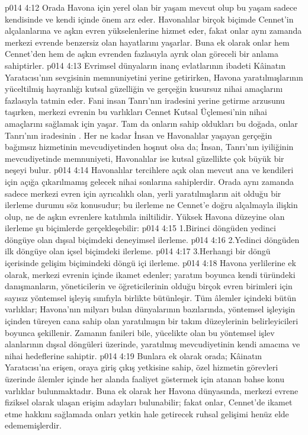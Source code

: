 \vs p014 4:12 Orada Havona için yerel olan bir yaşam mevcut olup bu yaşam sadece kendisinde ve kendi içinde önem arz eder. Havonalılar birçok biçimde Cennet’in alçalanlarına ve aşkın evren yükselenlerine hizmet eder, fakat onlar aynı zamanda merkezi evrende benzersiz olan hayatlarını yaşarlar. Buna ek olarak onlar hem Cennet’den hem de aşkın evrenden fazlasıyla ayrık olan göreceli bir anlama sahiptirler.
\vs p014 4:13 Evrimsel dünyaların inanç evlatlarının ibadeti Kâinatın Yaratıcısı’nın sevgisinin memnuniyetini yerine getirirken, Havona yaratılmışlarının yüceltilmiş hayranlığı kutsal güzelliğin ve gerçeğin kusursuz nihai amaçlarını fazlasıyla tatmin eder. Fani insan Tanrı’nın iradesini yerine getirme arzusunu taşırken, merkezi evrenin bu varlıkları Cennet Kutsal Üçlemesi’nin nihai amaçlarını sağlamak için yaşar. Tam da onların sahip oldukları bu doğada, onlar Tanrı’nın iradesinin . Her ne kadar İnsan ve Havonalılar yaşayan gerçeğin bağımsız hizmetinin mevcudiyetinden hoşnut olsa da; İnsan, Tanrı’nın iyiliğinin mevcudiyetinde memnuniyeti, Havonalılar ise kutsal güzellikte çok büyük bir neşeyi bulur.
\vs p014 4:14 Havonalılar tercihlere açık olan mevcut ana ve kendileri için açığa çıkarılmamış gelecek nihai sonlarına sahiplerdir. Orada aynı zamanda sadece merkezi evren için ayrıcalıklı olan, yerli yaratılmışların ait olduğu bir ilerleme durumu söz konusudur; bu ilerleme ne Cennet’e doğru alçalmayla ilişkin olup, ne de aşkın evrenlere katılımla iniltilidir. Yüksek Havona düzeyine olan ilerleme şu biçimlerde gerçekleşebilir:
\vs p014 4:15 1.\bibnobreakspace Birinci döngüden yedinci döngüye olan dışsal biçimdeki deneyimsel ilerleme.
\vs p014 4:16 2.\bibnobreakspace Yedinci döngüden ilk döngüye olan içsel biçimdeki ilerleme.
\vs p014 4:17 3.\bibnobreakspace Herhangi bir döngü içerisinde gelişim biçimindeki döngü içi ilerleme.
\vs p014 4:18 Havona yerlilerine ek olarak, merkezi evrenin içinde ikamet edenler; yaratım boyunca kendi türündeki danışmanların, yöneticilerin ve öğreticilerinin olduğu birçok evren birimleri için sayısız yöntemsel işleyiş sınıfıyla birlikte bütünleşir. Tüm âlemler içindeki bütün varlıklar; Havona’nın milyarı bulan dünyalarının bazılarında, yöntemsel işleyişin içinden türeyen cana sahip olan yaratılmışın bir takım düzeylerinin belirleyicileri boyunca şekillenir. Zamanın fanileri bile, yücelikte olan bu yöntemsel işlev alanlarının dışsal döngüleri üzerinde, yaratılmış mevcudiyetinin kendi amacına ve nihai hedeflerine sahiptir.
\vs p014 4:19 Bunlara ek olarak orada; Kâinatın Yaratıcısı’na erişen, oraya giriş çıkış yetkisine sahip, özel hizmetin görevleri üzerinde âlemler içinde her alanda faaliyet göstermek için atanan bahse konu varlıklar bulunmaktadır. Buna ek olarak her Havona dünyasında, merkezi evrene fiziksel olarak ulaşan erişim adayları bulunabilir; fakat onlar, Cennet’de ikamet etme hakkını sağlamada onları yetkin hale getirecek ruhsal gelişimi henüz elde edememişlerdir.
